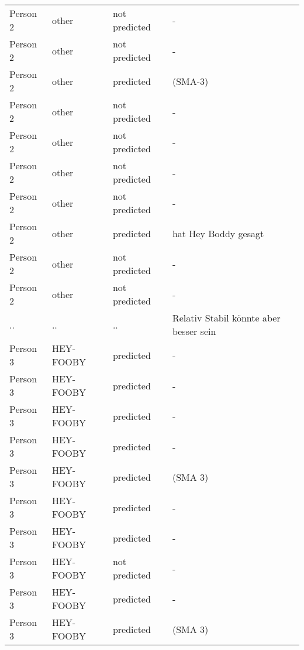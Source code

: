 \documentclass[main.tex]{subfiles} %
\begin{document}
\begin{longtable}{|p{3cm}|p{3cm}|p{3cm}|p{6cm}|}
    Person 2 & other & not predicted & - \\
    Person 2 & other & not predicted & - \\
    Person 2 & other & predicted & (SMA-3) \\
    Person 2 & other & not predicted & - \\
    Person 2 & other & not predicted & - \\
    Person 2 & other & not predicted & - \\
    Person 2 & other & not predicted & - \\
    Person 2 & other & predicted & hat Hey Boddy gesagt \\
    Person 2 & other & not predicted & - \\
    Person 2 & other & not predicted & - \\
    .. & .. & .. & Relativ Stabil könnte aber besser sein \\
    
    Person 3 & HEY-FOOBY & predicted & - \\
    Person 3 & HEY-FOOBY & predicted & - \\
    Person 3 & HEY-FOOBY & predicted & - \\
    Person 3 & HEY-FOOBY & predicted & - \\
    Person 3 & HEY-FOOBY & predicted & (SMA 3) \\
    Person 3 & HEY-FOOBY & predicted & - \\
    Person 3 & HEY-FOOBY & predicted & - \\
    Person 3 & HEY-FOOBY & not predicted & - \\
    Person 3 & HEY-FOOBY & predicted & - \\
    Person 3 & HEY-FOOBY & predicted & (SMA 3) \\
    

\end{longtable}
\end{document}
